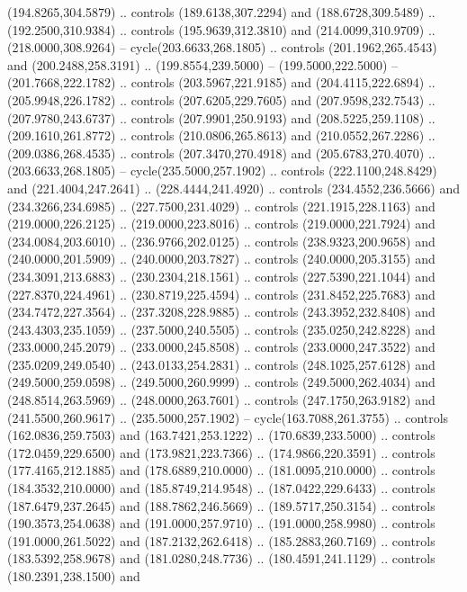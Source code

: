   (194.8265,304.5879) .. controls (189.6138,307.2294) and (188.6728,309.5489) ..
  (192.2500,310.9384) .. controls (195.9639,312.3810) and (214.0099,310.9709) ..
  (218.0000,308.9264) -- cycle(203.6633,268.1805) .. controls
  (201.1962,265.4543) and (200.2488,258.3191) .. (199.8554,239.5000) --
  (199.5000,222.5000) -- (201.7668,222.1782) .. controls (203.5967,221.9185) and
  (204.4115,222.6894) .. (205.9948,226.1782) .. controls (207.6205,229.7605) and
  (207.9598,232.7543) .. (207.9780,243.6737) .. controls (207.9901,250.9193) and
  (208.5225,259.1108) .. (209.1610,261.8772) .. controls (210.0806,265.8613) and
  (210.0552,267.2286) .. (209.0386,268.4535) .. controls (207.3470,270.4918) and
  (205.6783,270.4070) .. (203.6633,268.1805) -- cycle(235.5000,257.1902) ..
  controls (222.1100,248.8429) and (221.4004,247.2641) .. (228.4444,241.4920) ..
  controls (234.4552,236.5666) and (234.3266,234.6985) .. (227.7500,231.4029) ..
  controls (221.1915,228.1163) and (219.0000,226.2125) .. (219.0000,223.8016) ..
  controls (219.0000,221.7924) and (234.0084,203.6010) .. (236.9766,202.0125) ..
  controls (238.9323,200.9658) and (240.0000,201.5909) .. (240.0000,203.7827) ..
  controls (240.0000,205.3155) and (234.3091,213.6883) .. (230.2304,218.1561) ..
  controls (227.5390,221.1044) and (227.8370,224.4961) .. (230.8719,225.4594) ..
  controls (231.8452,225.7683) and (234.7472,227.3564) .. (237.3208,228.9885) ..
  controls (243.3952,232.8408) and (243.4303,235.1059) .. (237.5000,240.5505) ..
  controls (235.0250,242.8228) and (233.0000,245.2079) .. (233.0000,245.8508) ..
  controls (233.0000,247.3522) and (235.0209,249.0540) .. (243.0133,254.2831) ..
  controls (248.1025,257.6128) and (249.5000,259.0598) .. (249.5000,260.9999) ..
  controls (249.5000,262.4034) and (248.8514,263.5969) .. (248.0000,263.7601) ..
  controls (247.1750,263.9182) and (241.5500,260.9617) .. (235.5000,257.1902) --
  cycle(163.7088,261.3755) .. controls (162.0836,259.7503) and
  (163.7421,253.1222) .. (170.6839,233.5000) .. controls (172.0459,229.6500) and
  (173.9821,223.7366) .. (174.9866,220.3591) .. controls (177.4165,212.1885) and
  (178.6889,210.0000) .. (181.0095,210.0000) .. controls (184.3532,210.0000) and
  (185.8749,214.9548) .. (187.0422,229.6433) .. controls (187.6479,237.2645) and
  (188.7862,246.5669) .. (189.5717,250.3154) .. controls (190.3573,254.0638) and
  (191.0000,257.9710) .. (191.0000,258.9980) .. controls (191.0000,261.5022) and
  (187.2132,262.6418) .. (185.2883,260.7169) .. controls (183.5392,258.9678) and
  (181.0280,248.7736) .. (180.4591,241.1129) .. controls (180.2391,238.1500) and
